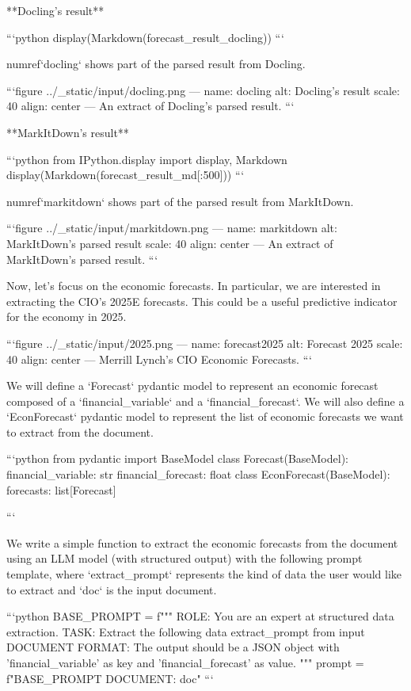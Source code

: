 **Docling's result**


```python
display(Markdown(forecast_result_docling))
```

{numref}`docling` shows part of the parsed result from Docling.

```{figure} ../_static/input/docling.png
---
name: docling
alt: Docling's result
scale: 40%
align: center
---
An extract of Docling's parsed result.
```


**MarkItDown's result**


```python
from IPython.display import display, Markdown
display(Markdown(forecast_result_md[:500]))
```

{numref}`markitdown` shows part of the parsed result from MarkItDown.

```{figure} ../_static/input/markitdown.png
---
name: markitdown
alt: MarkItDown's parsed result
scale: 40%
align: center
---
An extract of MarkItDown's parsed result.
```

Now, let's focus on the economic forecasts. In particular, we are interested in extracting the CIO's 2025E forecasts. This could be a useful predictive indicator for the economy in 2025.

```{figure} ../_static/input/2025.png
---
name: forecast2025
alt: Forecast 2025
scale: 40%
align: center
---
Merrill Lynch's CIO Economic Forecasts.
```

We will define a `Forecast` pydantic model to represent an economic forecast composed of a `financial_variable` and a `financial_forecast`. We will also define a `EconForecast` pydantic model to represent the list of economic forecasts we want to extract from the document.



```python
from pydantic import BaseModel
class Forecast(BaseModel):
    financial_variable: str
    financial_forecast: float
class EconForecast(BaseModel):
    forecasts: list[Forecast]

```

We write a simple function to extract the economic forecasts from the document using an LLM model (with structured output) with the following prompt template, where `extract_prompt` represents the kind of data the user would like to extract and `doc` is the input document.

```python
BASE_PROMPT = f"""
    ROLE: You are an expert at structured data extraction. 
    TASK: Extract the following data {extract_prompt} from input DOCUMENT
    FORMAT: The output should be a JSON object with 'financial_variable' as key and 'financial_forecast' as value.
    """
prompt = f"{BASE_PROMPT} \n\n DOCUMENT: {doc}"
```


